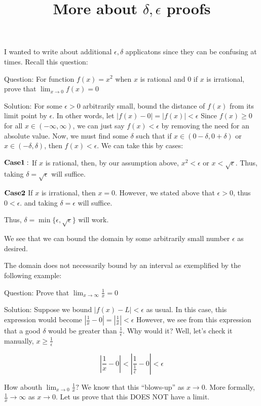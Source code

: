 \documentclass[12pt]{article}
\title{More about $\delta,\epsilon$ proofs}
\theoremstyle{remark}
\begin{document}
\maketitle




I wanted to write about additional $\epsilon,\delta$ applicatons since they can be confusing at times. Recall this question:

Question: For function $f(x) = x^2$ when $x$ is rational and 0 if $x$ is irrational, prove that $\lim_{x \rightarrow 0}f(x) = 0$

Solution: For some $\epsilon > 0$ arbitrarily small, bound the distance of $f(x)$ from its limit point by $\epsilon$. In other words, let $|f(x) - 0| = |f(x)| < \epsilon$ Since $f(x) \geq 0$ for all $x \in (-\infty,\infty)$, we can just say $f(x) < \epsilon$ by removing the need for an absolute value. Now, we must find some $\delta$ such that if $x \in (0-\delta,0+\delta)$ or $x \in (-\delta,\delta)$, then $f(x) < \epsilon$. We can take this by cases: \par
${\bf Case 1:}$ If $x$ is rational, then, by our assumption above, $x^2 < \epsilon$ or $x < \sqrt{\epsilon}$. Thus, taking $\delta = \sqrt{\epsilon}$ will suffice. \par
${\bf Case 2}$ If $x$ is irrational, then $x = 0$. However, we stated above that $\epsilon > 0 $, thus $ 0 <\epsilon$. and taking $\delta = \epsilon$ will suffice. \par
Thus, $\delta = \min\{\epsilon,\sqrt{\epsilon}\}$ will work.


We see that we can bound the domain by some arbitrarily small number $\epsilon$ as desired.
\newpage

The domain does not necessarily bound by an interval as exemplified by the following example:

Question: Prove that $\lim_{x \rightarrow \infty} \frac{1}{x} = 0$ \par

Solution: Suppose we bound $|f(x) - L| < \epsilon$ as usual. In this case, this expression would become $|\frac{1}{x} -0| = |\frac{1}{x}|  < \epsilon$
However, we see from this expression that a good $\delta$ would be greater than $\frac{1}{\epsilon}$. Why would it? Well, let's check it manually, $x \geq \frac{1}{\epsilon}$

 $$|\frac{1}{x} - 0| < |\frac{1}{\frac{1}{\epsilon}} - 0| < \epsilon$$
  
 How abouth $\lim_{x \rightarrow 0} \frac{1}{x}?$ We know that this ``blows-up'' as $x \rightarrow 0$. More formally, $\frac{1}{x}\rightarrow \infty$ as $x \rightarrow 0$. Let us prove that this DOES NOT have a limit.
 
\end{document}
